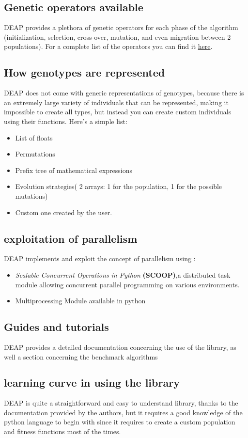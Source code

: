\documentclass{article}
\begin{document}
	\subsection{Genetic operators available}
	DEAP provides a plethora of genetic operators for each phase of the algorithm (initialization, selection, cross-over, mutation, and even migration between 2 populations). For a complete list of the operators you can find it \href{https://deap.readthedocs.io/en/master/api/tools.html}{here}.
	\subsection{How genotypes are represented}
	DEAP does not come with generic representations of genotypes, because there is an extremely large variety of individuals that can be represented, making it impossible to create all types, but instead you can create custom individuals using their functions. Here's a simple list:
	\begin{itemize}
		\item List of floats
		\item Permutations
		\item Prefix tree of mathematical expressions
		\item Evolution strategies( 2 arrays: 1 for the population, 1 for the possible mutations)
		\item Custom one created by the user.
	\end{itemize}
	\subsection{exploitation of parallelism}
	DEAP implements and exploit the concept of parallelism using :
	\begin{itemize}
		\item   \textit{Scalable Concurrent Operations in Python} \textbf{(SCOOP)},a distributed task module allowing concurrent parallel programming on various environments.
		\item Multiprocessing Module available in python
	\end{itemize}
	\subsection{Guides and tutorials}
	DEAP provides a detailed documentation concerning the use of the library, as well  a section concerning the benchmark algorithms
	\subsection{learning curve in using the library}
	DEAP is quite a straightforward and easy to understand library, thanks to the documentation provided by the authors, but it requires a good knowledge of the python language to begin with since it requires to create a custom population and fitness functions most of the times.
\end{document}
